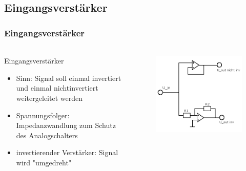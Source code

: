 \subsection{Eingangsverstärker} %
\label{sub:Eingangsverstärker}

\begin{frame}
\frametitle{Eingangsverstärker}
\framesubtitle{}
    \begin{columns}[c]
            \begin{block}{Eingangsverstärker}
                \begin{itemize}
                    \item Sinn: Signal soll einmal invertiert und einmal
                    nichtinvertiert weitergeleitet werden
                    \item Spannungsfolger: Impedanzwandlung zum Schutz des
                    Analogschalters
                    \item invertierender Verstärker: Signal wird "umgedreht"
                \end{itemize}     
            \end{block}
            \begin{figure}[H]
            \begin{center}
                    \includegraphics[scale=0.4]{./img/schaltung/Verstaerker.png}
            \end{center}
            \end{figure}
    \end{columns}
\end{frame}

